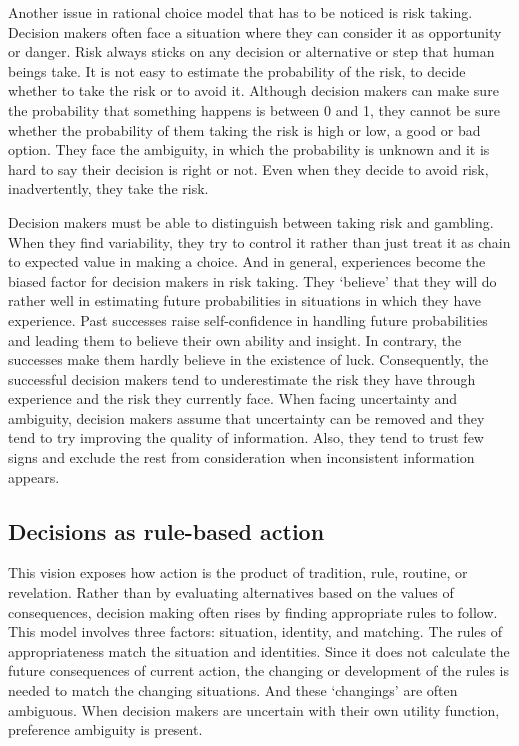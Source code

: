 Another issue in rational choice model that has to be noticed is risk taking. Decision makers often face a situation where they can consider it as opportunity or danger. Risk always sticks on any decision or alternative or step that human beings take. It is not easy to estimate the probability of the risk, to decide whether to take the risk or to avoid it. Although decision makers can make sure the probability that something happens is between 0 and 1, they cannot be sure whether the probability of them taking the risk is high or low, a good or bad option. They face the ambiguity, in which the probability is unknown and it is hard to say their decision is right or not. Even when they decide to avoid risk, inadvertently, they take the risk.

Decision makers must be able to distinguish between taking risk and gambling. When they find variability, they try to control it rather than just treat it as chain to expected value in making a choice\cite{7}. And in general, experiences become the biased factor for decision makers in risk taking. They ‘believe’ that they will do rather well in estimating future probabilities in situations in which they have experience. Past successes raise self-confidence in handling future probabilities and leading them to believe their own ability and insight\cite{2}. In contrary, the successes make them hardly believe in the existence of luck. Consequently, the successful decision makers tend to underestimate the risk they have through experience and the risk they currently face\cite{7}. When facing uncertainty and ambiguity, decision makers assume that uncertainty can be removed and they tend to try improving the quality of information. Also, they tend to trust few signs and exclude the rest from consideration when inconsistent information appears\cite{8}.

\subsection{Decisions as rule-based action}

This vision exposes how action is the product of tradition, rule, routine, or revelation. Rather than by evaluating alternatives based on the values of consequences, decision making often rises by finding appropriate rules to follow\cite{2}. This model involves three factors: situation, identity, and matching. The rules of appropriateness match the situation and identities. Since it does not calculate the future consequences of current action, the changing or development of the rules is needed to match the changing situations. And these ‘changings’ are often ambiguous. When decision makers are uncertain with their own utility function, preference ambiguity is present\cite{9}.

